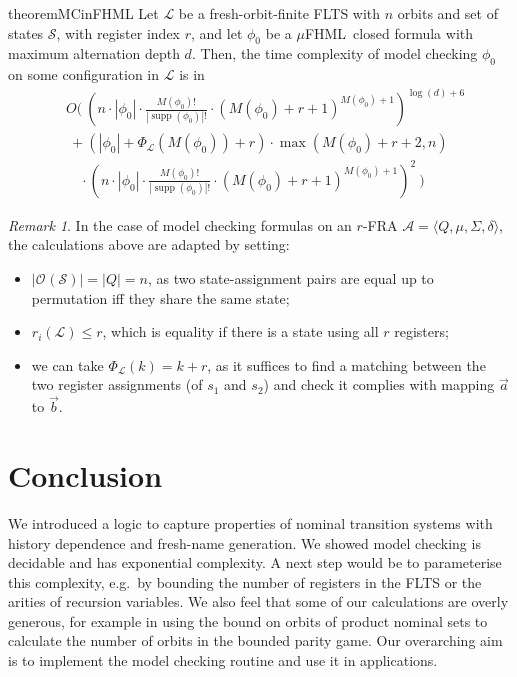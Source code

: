 \documentclass[10pt,a4paper]{article}
\theoremstyle{definition}
\theoremstyle{remark}
\newtheorem{remark}[theorem]{Remark}
\newcommand\fhml[0]{$\mu$FHML}
\newcommand\regindex[0]{r_i}
\DeclareMathOperator{\supp}{supp}
\newcommand\Acal{\mathcal{A}}
\newcommand\Lcal{\mathcal{L}}
\newcommand\Scal{\mathcal{S}}
\newcommand\orb[1][]{\mathcal{O}_{#1}}
\begin{document}
\begin{restatable}{theorem}{MCinFHML}\label{thm:MCinFHML}
  Let $\Lcal$ be a fresh-orbit-finite FLTS with $n$ orbits and set of states $\Scal$, with register index $r$,
  and let $\phi_0$ be a \fhml\ closed formula with maximum alternation depth $d$. 
    Then, the time complexity of model checking $\phi_0$ on some configuration in $\Lcal$ is in
	\begin{align*}
		&O(\ (n \cdot|\phi_0|\cdot \frac{M(\phi_0)!}{|\supp(\phi_0)|!}\cdot (M(\phi_0)+r + 1)^{M(\phi_0) + 1})^{\log(d) + 6}
		\\ &\ + 
		(|\phi_0| + \Phi_\Lcal(M(\phi_0)) +r)
		\cdot
		\max(M(\phi_0)+r + 2, n
		)\\&\quad \cdot 
		(n \cdot|\phi_0|\cdot \frac{M(\phi_0)!}{|\supp(\phi_0)|!}\cdot (M(\phi_0)+r + 1)^{M(\phi_0) + 1})
		^2\
		)
	\end{align*}
\end{restatable}


\begin{remark}
In the case of model checking formulas on an $r$-FRA $\Acal=\langle Q,\mu,\Sigma,\delta\rangle$, the calculations above are adapted by setting:
\begin{itemize}
\item $|\orb(\Scal)|=|Q|=n$, as two state-assignment pairs are equal up to permutation iff they share the same state;
\item $\regindex(\Lcal)\leq r$, which is equality if there is a state using all $r$  registers;
  \item we can take $\Phi_\Lcal(k)=k+r$, as it suffices to find a matching between the two register assignments (of $s_1$ and $s_2$) and check it complies with mapping $\vec a$ to $\vec b$.
  \end{itemize}
\end{remark}






\section{Conclusion}

We introduced a logic to capture properties of nominal transition systems with history dependence and fresh-name generation. We showed model checking is decidable and has exponential complexity. A next step would be to parameterise this complexity, e.g.\ by bounding the number of registers in the FLTS or the arities of recursion variables. We also feel that some of our calculations are overly generous, for example in using the bound on orbits of product nominal sets to calculate the number of orbits in the bounded parity game. Our overarching aim is to implement the model checking routine and use it in applications.
\end{document}
